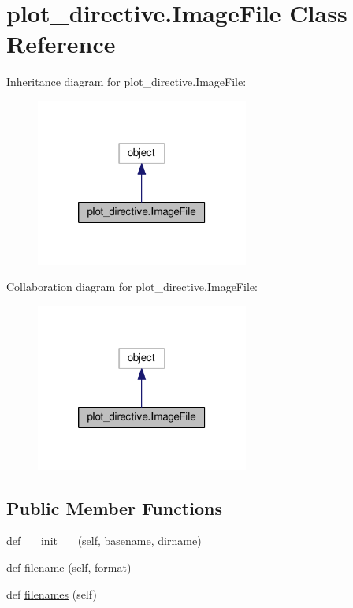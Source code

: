 \hypertarget{classplot__directive_1_1ImageFile}{}\section{plot\+\_\+directive.\+Image\+File Class Reference}
\label{classplot__directive_1_1ImageFile}


Inheritance diagram for plot\+\_\+directive.\+Image\+File\+:
\nopagebreak
\begin{figure}[H]
\begin{center}
\leavevmode
\includegraphics[width=198pt]{classplot__directive_1_1ImageFile__inherit__graph}
\end{center}
\end{figure}


Collaboration diagram for plot\+\_\+directive.\+Image\+File\+:
\nopagebreak
\begin{figure}[H]
\begin{center}
\leavevmode
\includegraphics[width=198pt]{classplot__directive_1_1ImageFile__coll__graph}
\end{center}
\end{figure}
\subsection*{Public Member Functions}
\begin{DoxyCompactItemize}
\item 
def \mbox{\hyperlink{classplot__directive_1_1ImageFile_a6c55e9ecf36e33f3faa0442a4ff1b1fb}{\+\_\+\+\_\+init\+\_\+\+\_\+}} (self, \mbox{\hyperlink{classplot__directive_1_1ImageFile_afa0e2d74c60b443628f731c96c7b1cb0}{basename}}, \mbox{\hyperlink{classplot__directive_1_1ImageFile_ab3f5e486f644bc939202814ecd5aec0c}{dirname}})
\item 
def \mbox{\hyperlink{classplot__directive_1_1ImageFile_ac0eb49bf3591003e4ffb6cca0c626eda}{filename}} (self, format)
\item 
def \mbox{\hyperlink{classplot__directive_1_1ImageFile_a1497c4d40e8500e207de9e483d639f39}{filenames}} (self)
\end{DoxyCompactItemize}
